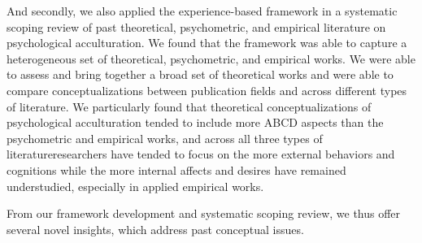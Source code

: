 \documentclass[man, 12pt, a4paper, mask]{apa7}
\providecommand{\DIFaddtex}[1]{{\protect\color{blue}\uwave{#1}}} %
\providecommand{\DIFaddbegin}{} %
\providecommand{\DIFaddend}{} %
\providecommand{\DIFadd}[1]{\texorpdfstring{\DIFaddtex{#1}}{#1}} %
\newcommand{\DIFaddincludegraphics}[2][]{{\color{blue}\fbox{\DIFOincludegraphics[#1]{#2}}}} %
\DeclareRobustCommand{\DIFaddbegin}{\DIFOaddbegin \let\includegraphics\DIFaddincludegraphics} %
\DeclareRobustCommand{\DIFaddend}{\DIFOaddend \let\includegraphics\DIFOincludegraphics} %
\begin{document}
And secondly, we also applied the experience-based framework in a systematic scoping review of past theoretical, psychometric, and empirical literature on psychological acculturation.
We found that the framework was able to capture a heterogeneous set of theoretical, psychometric, and empirical works. We were able to assess and bring together a broad set of theoretical works and were able to compare conceptualizations between publication fields and across different types of literature. We particularly found that theoretical conceptualizations of psychological acculturation tended to include more ABCD aspects than the psychometric and empirical works, and across all three types of literature\DIFaddbegin \DIFadd{, }\DIFaddend researchers have tended to focus on the more external behaviors and cognitions while the more internal affects and desires have remained understudied, especially in applied empirical works.

From our framework development and systematic scoping review, we thus offer several novel insights, which address past conceptual issues.
\end{document}
